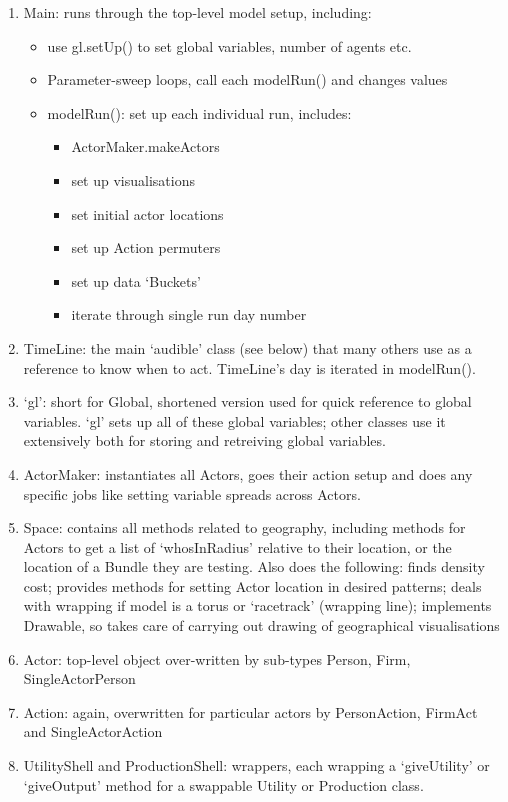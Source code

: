 \begin{enumerate}
	\item Main: runs through the top-level model setup, including:
\begin{itemize}
	\item use gl.setUp() to set global variables, number of agents etc.
	\item	Parameter-sweep loops, call each modelRun() and changes values
	\item modelRun(): set up each individual run, includes:
	\begin{itemize}
		\item ActorMaker.makeActors
		\item set up visualisations
		\item set initial actor locations
		\item set up Action permuters
		\item set up data `Buckets'
		\item iterate through single run day number
	\end{itemize}
	\end{itemize}%
	\item TimeLine: the main `audible' class (see below) that many others use as a reference to know when to act. TimeLine's day is iterated in modelRun().
	\item `gl': short for Global, shortened version used for quick reference to global variables. `gl' sets up all of these global variables; other classes use it extensively both for storing and retreiving global variables.
	\item ActorMaker: instantiates all Actors, goes their action setup and does any specific jobs like setting variable spreads across Actors.
	\item Space: contains all methods related to geography, including methods for Actors to get a list of `whosInRadius' relative to their location, or the location of a Bundle they are testing. Also does the following: finds density cost; provides methods for setting Actor location in desired patterns; deals with wrapping if model is a torus or `racetrack' (wrapping line); implements Drawable, so takes care of carrying out drawing of geographical visualisations
	\item Actor: top-level object over-written by sub-types Person, Firm, SingleActorPerson
	\item Action: again, overwritten for particular actors by PersonAction, FirmAct and SingleActorAction
	\item UtilityShell and ProductionShell: wrappers, each wrapping a `giveUtility' or `giveOutput' method for a swappable Utility or Production class. 

\end{enumerate}
